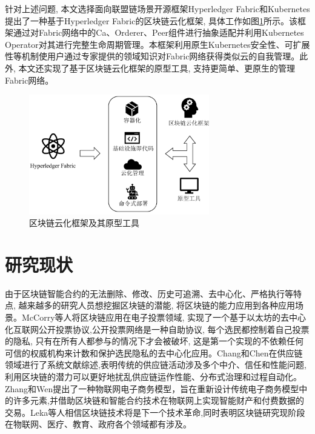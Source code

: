 针对上述问题, 本文选择面向联盟链场景开源框架Hyperledger Fabric和Kubernetes提出了一种基于Hyperledger Fabric的区块链云化框架, 具体工作如图\ref{framework_tool}所示。该框架通过对Fabric网络中的Ca、Orderer、Peer组件进行抽象适配并利用Kubernetes Operator对其进行完整生命周期管理。本框架利用原生Kubernetes安全性、可扩展性等机制使用户通过专家提供的领域知识对Fabric网络获得类似云的自我管理。此外, 本文还实现了基于区块链云化框架的原型工具, 支持更简单、更原生的管理Fabric网络。

\begin{figure}[h] %
    \centering %
    \includegraphics[width=0.7\textwidth]{FIGs/chapter1/framework_tool.pdf} %
    \caption{区块链云化框架及其原型工具} %
    \label{framework_tool} %
\end{figure}%

\section{研究现状}

由于区块链智能合约的无法删除、修改、历史可追溯、去中心化、严格执行等特点, 越来越多的研究人员想挖掘区块链的潜能, 将区块链的能力应用到各种应用场景。McCorry等人\cite{mccorry2017smart}将区块链应用在电子投票领域, 实现了一个基于以太坊的去中心化互联网公开投票协议,公开投票网络是一种自助协议, 每个选民都控制着自己投票的隐私, 只有在所有人都参与的情况下才会被破坏, 这是第一个实现的不依赖任何可信的权威机构来计数和保护选民隐私的去中心化应用。Chang和Chen\cite{chang2020blockchain}在供应链领域进行了系统文献综述,表明传统的供应链活动涉及多个中介、信任和性能问题,利用区块链的潜力可以更好地扰乱供应链运作性能、分布式治理和过程自动化。Zhang和Wen\cite{zhang2017iot}提出了一种物联网电子商务模型，旨在重新设计传统电子商务模型中的许多元素,并借助区块链和智能合约技术在物联网上实现智能财产和付费数据的交易。Leka等人\cite{leka2019systematic}相信区块链技术将是下一个技术革命,同时表明区块链研究现阶段在物联网\cite{christidis2016blockchains}、医疗、教育、政府各个领域都有涉及。

